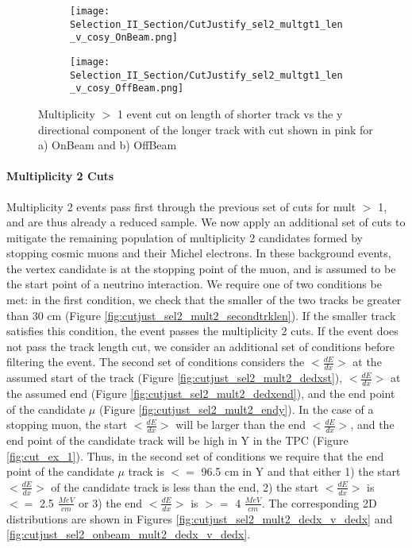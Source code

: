 \begin{figure}[t!]
\centering
  \begin{subfigure}[t]{0.25\textwidth}
    \centering
\texttt{[image: Selection\_II\_Section/CutJustify\_sel2\_multgt1\_len\_v\_cosy\_OnBeam.png]}
 \caption{ }
  \end{subfigure} 
  \hspace{20mm}
  \begin{subfigure}[t]{0.25\textwidth}
    \centering
  \texttt{[image: Selection\_II\_Section/CutJustify\_sel2\_multgt1\_len\_v\_cosy\_OffBeam.png]}
   \caption{ }
  \end{subfigure} 
\caption{ Multiplicity $>$ 1 event cut on length of shorter track vs the y directional component of the longer track with cut shown in pink for a) OnBeam and b) OffBeam }
\label{fig:cutjust_sel2_onbeam_multgt1_len_v_cosy}
\end{figure}

\clearpage
\paragraph{Multiplicity 2 Cuts}
Multiplicity 2 events pass first through the previous set of cuts for mult $>$ 1, and are thus already a reduced sample. We now apply an additional set of cuts to mitigate the remaining population of multiplicity 2 candidates formed by stopping cosmic muons and their Michel electrons. In these background events, the vertex candidate is at the stopping point of the muon, and is assumed to be the start point of a neutrino interaction. We require one of two conditions be met: in the first condition, we check that the smaller of the two tracks be greater than 30 cm (Figure \ref{fig:cutjust_sel2_mult2_secondtrklen}). If the smaller track satisfies this condition, the event passes the multiplicity 2 cuts. If the event does not pass the track length cut, we consider an additional set of conditions before filtering the event.  The second set of conditions considers the $<\frac{dE}{dx}>$ at the assumed start of the track (Figure \ref{fig:cutjust_sel2_mult2_dedxst}), $<\frac{dE}{dx}>$ at the assumed end (Figure \ref{fig:cutjust_sel2_mult2_dedxend}), and the end point of the candidate $\mu$ (Figure \ref{fig:cutjust_sel2_mult2_endy}).  In the case of a stopping muon, the start $<\frac{dE}{dx}>$ will be larger than the end $<\frac{dE}{dx}>$, and the end point of the candidate track will be high in Y in the TPC (Figure \ref{fig:cut_ex_1}).  Thus, in the second set of conditions we require that the end point of the candidate $\mu$ track is $<=$ 96.5 cm in Y and that either 1) the start $<\frac{dE}{dx}>$ of the candidate track is less than the end, 2) the start $<\frac{dE}{dx}>$ is $<=$ 2.5 $\frac{MeV}{cm}$ or 3) the end $<\frac{dE}{dx}>$ is $>=$ 4 $\frac{MeV}{cm}$. The corresponding 2D distributions are shown in Figures \ref{fig:cutjust_sel2_mult2_dedx_v_dedx} and \ref{fig:cutjust_sel2_onbeam_mult2_dedx_v_dedx}.

